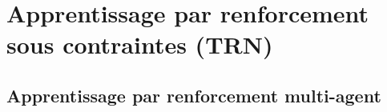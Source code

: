 \section{Apprentissage par renforcement sous contraintes (TRN)}

\subsection{Apprentissage par renforcement multi-agent}







